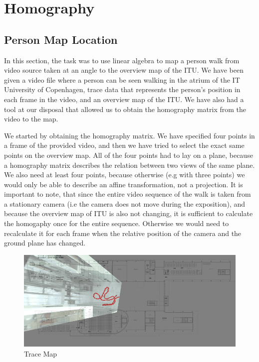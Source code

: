 \section{Homography}
\subsection{Person Map Location}

In this section, the task was to use linear algebra to map a person walk from video source taken at an angle to the overview map of the ITU. We have been given a video file where a person can be seen walking in the atrium of the IT University of Copenhagen, trace data that represents the person's position in each frame in the video, and an overview map of the ITU. We have also had a tool at our disposal that allowed us to obtain the homography matrix from the video to the map. 

We started by obtaining the homography matrix. We have specified four points in a frame of the provided video, and then we have tried to select the exact same points on the overview map. All of the four points had to lay on a plane, because a homography matrix describes the relation between two views of the same plane. We also need at least four points, because otherwise (e.g with three points) we would only be able to describe an affine transformation, not a projection. It is important to note, that since the entire video sequence of the walk is taken from a stationary camera (i.e the camera does not move during the exposition), and because the overview map of ITU is also not changing, it is sufficient to calculate the homogaphy once for the entire sequence. Otherwise we would need to recalculate it for each frame when the relative position of the camera and the ground plane has changed.

\begin{figure}[h!]
	\centering
	\includegraphics[width=\textwidth]{final/images/trace_map.png}
	\caption{Trace Map}
	\label{fig:trace}
\end{figure}

